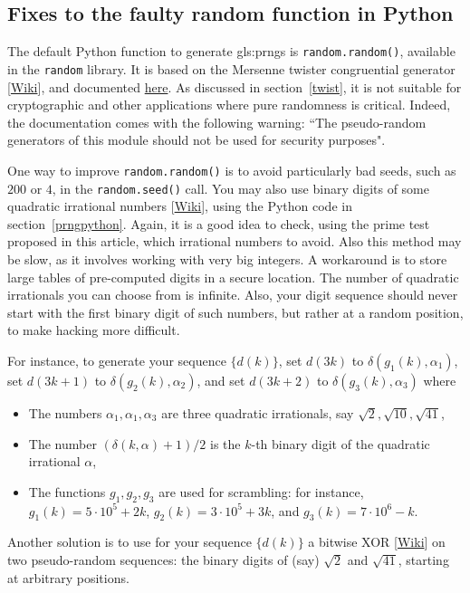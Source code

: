 \documentclass[oneside,10pt]{book}
\begin{document}
\subsection{Fixes to the faulty random function in Python}\label{fixp}

The default Python function to generate \glspl{gls:prng} is \texttt{random.random()}, available in the \texttt{random} library.
It is based on the \textcolor{index}{Mersenne twister} congruential generator [\href{https://en.wikipedia.org/wiki/Mersenne_Twister}{Wiki}], and documented \href{https://docs.python.org/3/library/random.html}{here}. As discussed in section~\ref{twist}, it is not suitable for cryptographic and other applications where pure randomness is critical. Indeed, the documentation comes with the following warning: ``The pseudo-random generators of this module should not be used for security purposes". 

One way to improve  \texttt{random.random()} is to avoid particularly bad seeds, such as $200$ or $4$, in the \texttt{random.seed()} call. You may also use binary digits of some 
\textcolor{index}{quadratic irrational numbers} [\href{https://en.wikipedia.org/wiki/Quadratic_irrational_number}{Wiki}], using the Python code in section~\ref{prngpython}. Again, it is a good idea to check, using the prime test proposed in this article, which irrational numbers to avoid. Also this method may be slow, as it involves working with very big integers. A workaround is to store large tables of pre-computed digits in a secure location. The number of quadratic irrationals you can choose from is infinite. Also, your digit sequence
 should never start with the first binary digit of such numbers, but rather at a random position, to make hacking more difficult. 

For instance, to generate your sequence $\{d(k)\}$, set $d(3k)$ to $\delta(g_1(k),\alpha_1)$, set 
 $d(3k+1)$ to $\delta(g_2(k),\alpha_2)$, and set  $d(3k+2)$ to $\delta(g_3(k),\alpha_3)$ where 
\begin{itemize}
\item The numbers $\alpha_1, \alpha_1, \alpha_3$ are three quadratic irrationals, say $\sqrt{2},\sqrt{10},\sqrt{41}$,
\item The number $(\delta(k,\alpha)+1)/2$ is the $k$-th binary digit of the quadratic irrational $\alpha$, 
\item The functions $g_1,g_2,g_3$ are used for scrambling: for instance, 
$g_1(k)=5\cdot 10^5 +2k$, $g_2(k)=3\cdot 10^5 +3k$, and $g_3(k)=7\cdot 10^6 -k$.
\end{itemize}
Another solution is to use for your sequence $\{d(k)\}$ a \textcolor{index}{bitwise XOR} [\href{https://en.wikipedia.org/wiki/Bitwise_operation}{Wiki}] on two pseudo-random sequences: the binary digits of (say) $\sqrt{2}$ and $\sqrt{41}$, starting at arbitrary positions.
\end{document}

